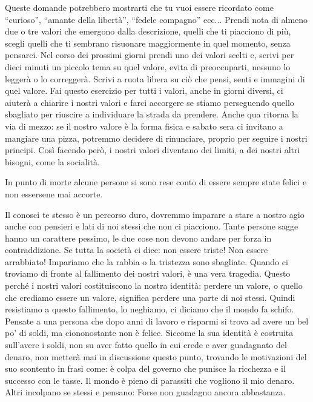 \documentclass[12pt]{book} %
\begin{document}
\bigskip

Queste domande potrebbero mostrarti che tu vuoi essere ricordato come “curioso”, “amante della libertà”, “fedele
compagno” ecc... Prendi nota di almeno due o tre valori che emergono dalla descrizione, quelli che ti piacciono di più,
scegli quelli che ti sembrano risuonare maggiormente in quel momento, senza pensarci. Nel corso dei prossimi giorni
prendi uno dei valori scelti e, scrivi per dieci minuti un piccolo tema su quel valore, evita di preoccuparti, nessuno
lo leggerà o lo correggerà. Scrivi a ruota libera su ciò che pensi, senti e immagini di quel valore. Fai questo
esercizio per tutti i valori, anche in giorni diversi, ci aiuterà a chiarire i nostri valori e farci accorgere se
stiamo perseguendo quello sbagliato per riuscire a individuare la strada da prendere. Anche qua ritorna la via di
mezzo: se il nostro valore è la forma fisica e sabato sera ci invitano a mangiare una pizza, potremmo decidere di
rinunciare, proprio per seguire i nostri principi. Così facendo però, i nostri valori diventano dei limiti, a dei
nostri altri bisogni, come la socialità.


\bigskip

In punto di morte alcune persone si sono rese conto di essere sempre state felici e non essersene mai accorte.


\bigskip

Il conosci te stesso è un percorso duro, dovremmo imparare a stare a nostro agio anche con pensieri e lati di noi stessi
che non ci piacciono. Tante persone sagge hanno un carattere pessimo, le due cose non devono andare per forza in
contraddizione. Se tutta la società ci dice: non essere triste! Non essere arrabbiato! Impariamo che la rabbia o la
tristezza sono sbagliate. Quando ci troviamo di fronte al fallimento dei nostri valori, è una vera tragedia. Questo
perché i nostri valori costituiscono la nostra identità: perdere un valore, o quello che crediamo essere un valore,
significa perdere una parte di noi stessi. Quindi resistiamo a questo fallimento, lo neghiamo, ci diciamo che il mondo
fa schifo. Pensate a una persona che dopo anni di lavoro e risparmi si trova ad avere un bel po'
di soldi, ma ciononostante non è felice. Siccome la sua identità è costruita sull'avere i soldi,
non su aver fatto quello in cui crede e aver guadagnato del denaro, non metterà mai in discussione questo punto,
trovando le motivazioni del suo scontento in frasi come: è colpa del governo che punisce la ricchezza e il successo con
le tasse. Il mondo è pieno di parassiti che vogliono il mio denaro. Altri incolpano se stessi e pensano: Forse non
guadagno ancora abbastanza.
\end{document}
